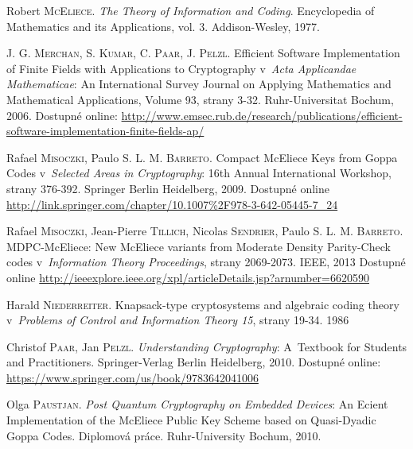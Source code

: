 \documentclass[thesis=M,czech,hidelinks]{FITthesis}[2012/06/26]
\newcommand{\0}{{\textcolor[gray]{0.80}{0}}}
\begin{document}
\begin{thebibliography}{99}
        Robert \textsc{McEliece}. \emph{The Theory of Information and Coding}.
        Encyclopedia of Mathematics and its Applications, vol. 3.
        Addison-Wesley, 1977.

        J. G. \textsc{Merchan}, S. \textsc{Kumar}, C. \textsc{Paar},
        J. \textsc{Pelzl}. Efficient Software Implementation of Finite
        Fields with Applications to Cryptography v~\emph{Acta Applicandae
        Mathematicae}: An International Survey Journal on Applying Mathematics
        and Mathematical Applications, Volume 93, strany  3-32.
        Ruhr-Universitat Bochum, 2006. Dostupné online:
        \url{http://www.emsec.rub.de/research/publications/efficient-software-implementation-finite-fields-ap/}

        Rafael \textsc{Misoczki}, Paulo S. L. M. \textsc{Barreto}. Compact
        McEliece Keys from Goppa Codes v~\emph{Selected Areas in Cryptography}:
        16th Annual International Workshop, strany 376-392. Springer Berlin
        Heidelberg, 2009. Dostupné online
        \url{http://link.springer.com/chapter/10.1007\%2F978-3-642-05445-7\_24}

        Rafael \textsc{Misoczki}, Jean-Pierre \textsc{Tillich}, Nicolas
        \textsc{Sendrier}, Paulo S. L. M. \textsc{Barreto}. MDPC-McEliece: New
        McEliece variants from Moderate Density Parity-Check codes
        v~\emph{Information Theory Proceedings}, strany 2069-2073. IEEE, 2013
        Dostupné online
        \url{http://ieeexplore.ieee.org/xpl/articleDetails.jsp?arnumber=6620590}

        Harald \textsc{Niederreiter}. Knapsack-type cryptosystems and
        algebraic coding theory v~\emph{Problems of Control and Information
        Theory 15}, strany 19-34. 1986

        Christof \textsc{Paar}, Jan \textsc{Pelzl}. \emph{Understanding
        Cryptography}: A~Textbook for Students and Practitioners.
        Springer-Verlag Berlin Heidelberg, 2010. Dostupné
        online: \url{https://www.springer.com/us/book/9783642041006}

        Olga \textsc{Paustjan}. \emph{Post Quantum Cryptography on Embedded
        Devices}: An Ecient Implementation of the McEliece Public Key Scheme
        based on Quasi-Dyadic Goppa Codes. Diplomová práce. Ruhr-University
        Bochum, 2010.


\end{thebibliography}
\end{document}
